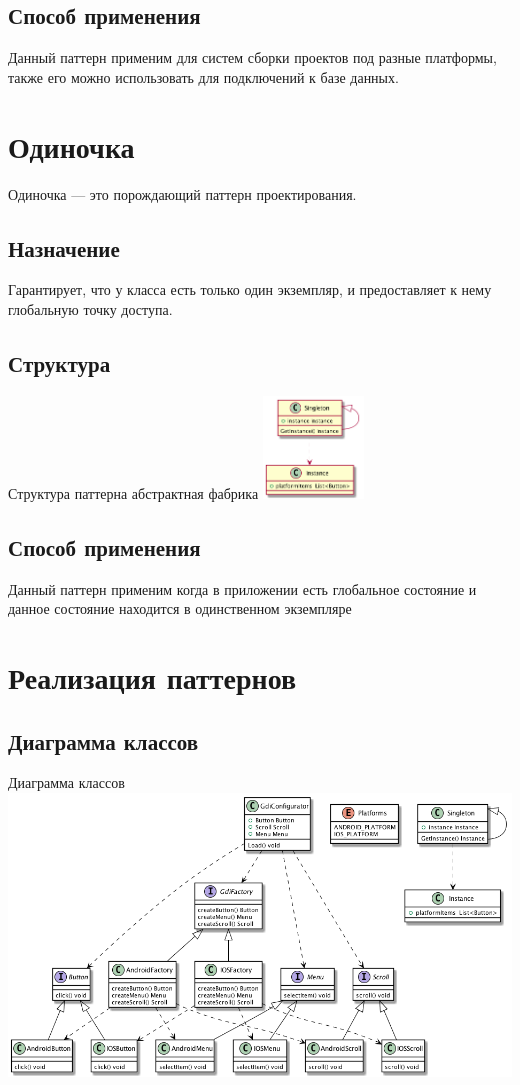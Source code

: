 \documentclass[PI,LAB]{HSEUniversity}
\begin{document}
\section{Способ применения}
Данный паттерн применим для систем сборки проектов под разные платформы, также его можно использовать для подключений к базе данных.
\chapter{Одиночка}
Одиночка — это порождающий паттерн проектирования.
\section{Назначение}
Гарантирует, что у класса есть только один экземпляр, и предоставляет к нему глобальную точку доступа.
\section{Структура}

\begin{FIGURE}[h]{Структура паттерна абстрактная фабрика\label{fig:flexobas}}
	\includegraphics[width=0.2\textwidth]{../out/diagrams/singleton/singleton}
\end{FIGURE}

\section{Способ применения}
Данный паттерн применим когда в приложении есть глобальное состояние и данное состояние находится в одинственном экземпляре
\chapter{Реализация паттернов}

\section{Диаграмма классов}
\begin{FIGURE}[h]{Диаграмма классов \label{fig:example-figure}}
	\includegraphics[width=\textwidth]{../out/diagrams/factory-go/factory-go}
\end{FIGURE}
\end{document}
